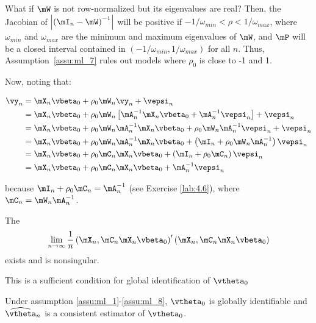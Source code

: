 \documentclass[english,12pt]{book}\usepackage[]{graphicx}\usepackage[]{xcolor}
\begin{document}
What if $\mW$ is not row-normalized but its eigenvalues are real? Then, the Jacobian of $\left|\left(\mI_n- \mW\right)^{-1}\right|$ will be positive if $-1/\omega_{min} < \rho < 1/\omega_{max}$, where $\omega_{min}$ and $\omega_{max}$ are the minimum and maximum eigenvalues of $\mW$, and $\mP$ will be a closed interval contained in $(-1/\omega_{min}, 1/\omega_{max})$ for all $n$. Thus, Assumption~\ref{assu:ml_7} rules out models where $\rho_0$ is close to -1 and 1.  

Now, noting that:


\begin{equation}
	\begin{aligned}
	\vy_n & = \mX_n\vbeta_0 + \rho_0\mW_n\vy_n + \vepsi_n \\
	      & = \mX_n\vbeta_0 + \rho_0\mW_n\left[\mA^{-1}_n\mX_n\vbeta_0 + \mA^{-1}_n\vepsi_n\right] + \vepsi_n \\
	      & = \mX_n\vbeta_0 + \rho_0\mW_n\mA^{-1}_n\mX_n\vbeta_0 + \rho_0\mW_n\mA^{-1}_n\vepsi_n + \vepsi_n \\
	      & = \mX_n\vbeta_0 + \rho_0\mW_n\mA^{-1}_n\mX_n\vbeta_0  + \left(\mI_n + \rho_0\mW_n\mA^{-1}_n\right)\vepsi_n \\
	      & = \mX_n\vbeta_0 + \rho_0\mC_n\mX_n\vbeta_0  + \left(\mI_n + \rho_0\mC_n\right)\vepsi_n \\
	      & = \mX_n\vbeta_0 + \rho_0\mC_n\mX_n\vbeta_0  +\mA_n^{-1}\vepsi_n
	\end{aligned}
\end{equation}

because $\mI_n + \rho_0\mC_n = \mA_n^{-1}$ (see Exercise  \ref{lab:4.6}), where $\mC_n=\mW_n\mA_n^{-1}$.


\begin{assumption}\label{assu:ml_8}
		The
		\begin{equation*}
			\lim_{n\to \infty}\frac{1}{n}\left(\mX_n, \mC_n\mX_n\vbeta_0\right)'\left(\mX_n, \mC_n\mX_n\vbeta_0\right)
		\end{equation*}
		 exists and is nonsingular.
\end{assumption}

This is a sufficient condition for global identification of $\vtheta_0$


\begin{theorem}[Consistency]\label{teorem:Consistency_ML}
	Under assumption \ref{assu:ml_1}-\ref{assu:ml_8}, $\vtheta_0$ is globally identifiable and $\widehat{\vtheta}_n$ is a consistent estimator of $\vtheta_0$.
\end{theorem}
\end{document}

